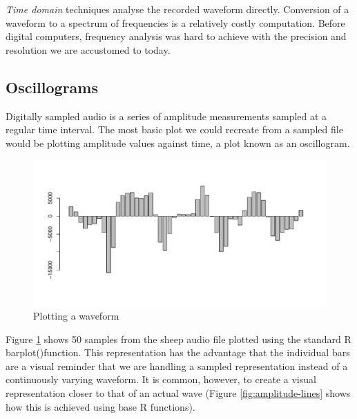 \documentclass[
]{book}
\begin{document}
\emph{Time domain} techniques analyse the recorded waveform directly. Conversion of a waveform to a spectrum of frequencies is a relatively costly computation. Before digital computers, frequency analysis was hard to achieve with the precision and resolution we are accustomed to today.

\hypertarget{oscillograms}{%
\subsection{Oscillograms}\label{oscillograms}}

Digitally sampled audio is a series of amplitude measurements sampled at a regular time interval. The most basic plot we could recreate from a sampled file would be plotting amplitude values against time, a plot known as an oscillogram.

\begin{figure}

{\centering \includegraphics[width=0.9\linewidth]{_main_files/figure-latex/amplitude-bars-1} 

}

\caption{Plotting a waveform}\label{fig:amplitude-bars}
\end{figure}

Figure \ref{fig:amplitude-bars} shows 50 samples from the sheep audio file plotted using the standard R barplot()function. This representation has the advantage that the individual bars are a visual reminder that we are handling a sampled representation instead of a continuously varying waveform. It is common, however, to create a visual representation closer to that of an actual wave (Figure \ref{fig:amplitude-lines} shows how this is achieved using base R functions).
\end{document}
